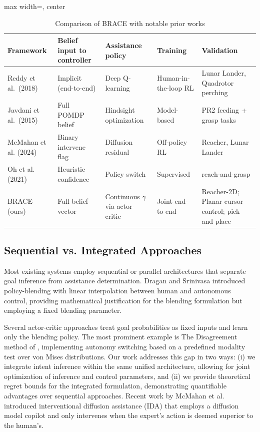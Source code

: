 \documentclass[11pt]{article}
\begin{document}
\begin{table}[h]
\caption{Comparison of BRACE with notable prior works}
\begin{adjustbox}{max width=\textwidth, center}
\renewcommand{\arraystretch}{1.3}  %
\begin{tabular}{>{\raggedright\arraybackslash}p{2.5cm}
               >{\raggedright\arraybackslash}p{2.6cm}
               >{\raggedright\arraybackslash}p{2.6cm}
               >{\raggedright\arraybackslash}p{2.3cm}
               >{\raggedright\arraybackslash}p{2.4cm}}
\toprule
Framework & Belief input to controller & Assistance policy & Training & Validation \\
\midrule
Reddy et al.\ (2018) & Implicit (end-to-end) & Deep Q-learning & Human-in-the-loop RL & Lunar Lander, Quadrotor perching  \\[1pt]
Javdani et al.\ (2015) & Full POMDP belief & Hindsight optimization & Model-based & PR2 feeding + grasp tasks \\[1pt]
McMahan et al. (2024) & Binary intervene flag & Diffusion residual & Off-policy RL & Reacher, Lunar Lander\\[1pt]
Oh et al. (2021) & Heuristic confidence & Policy switch & Supervised & reach-and-grasp \\[1pt]
BRACE (ours) & Full belief vector & Continuous $\gamma$ via actor-critic & Joint end-to-end & Reacher-2D; Planar cursor control; pick and place \\
\bottomrule
\end{tabular}
\end{adjustbox}
\end{table}



\subsection{Sequential vs. Integrated Approaches}

Most existing systems employ sequential or parallel architectures that separate goal inference from assistance determination. Dragan and Srinivasa \cite{dragan2013policy} introduced policy-blending with linear interpolation between human and autonomous control, providing mathematical justification for the blending formulation but employing a fixed blending parameter.

Several actor-critic approaches treat goal probabilities as fixed inputs and learn only the blending policy. The most prominent example is The Disagreement method of \citet{oh2021disagreement}, implementing autonomy switching based on a predefined modality test over von Mises distributions. Our work addresses this gap in two ways: (i) we integrate intent inference within the same unified architecture, allowing for joint optimization of inference and control parameters, and (ii) we provide theoretical regret bounds for the integrated formulation, demonstrating quantifiable advantages over sequential approaches. Recent work by McMahan et al. \cite{IDA} introduced interventional diffusion assistance (IDA) that employs a diffusion model copilot and only intervenes when the expert's action is deemed superior to the human's. 
\end{document}

